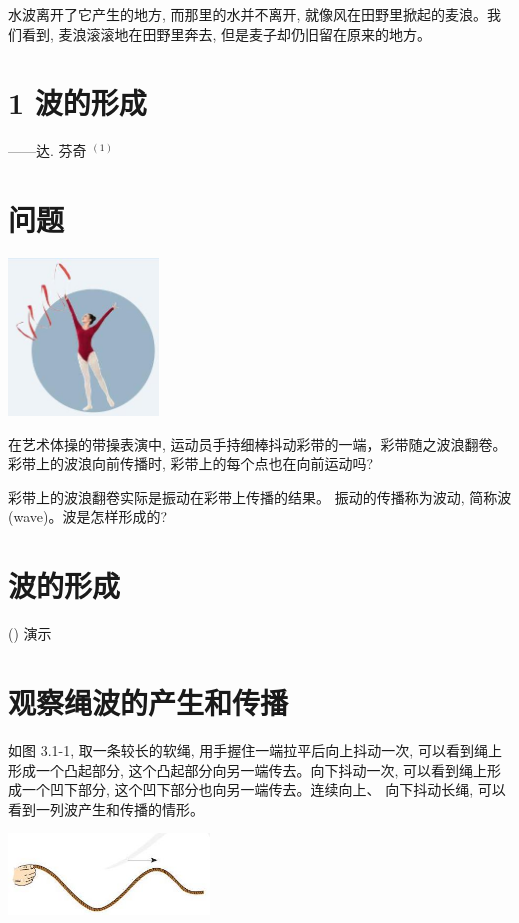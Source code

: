 \documentclass[10pt]{article}
\begin{document}
水波离开了它产生的地方, 而那里的水并不离开, 就像风在田野里掀起的麦浪。我们看到, 麦浪滚滚地在田野里奔去, 但是麦子却仍旧留在原来的地方。

\section*{1 波的形成}

——达. 芬奇 \({}^{\left( 1\right) }\)

\section*{问题}

\begin{center}
\includegraphics[max width=0.3\textwidth]{images/01910e4c-ebb8-7d2c-8f2f-2375bc1d2d12_67_503150.jpg}
\end{center}

在艺术体操的带操表演中, 运动员手持细棒抖动彩带的一端，彩带随之波浪翻卷。彩带上的波浪向前传播时, 彩带上的每个点也在向前运动吗?

彩带上的波浪翻卷实际是振动在彩带上传播的结果。 振动的传播称为波动, 简称波 (wave)。波是怎样形成的?

\section*{波的形成}

() 演示

\section*{观察绳波的产生和传播}

如图 3.1-1, 取一条较长的软绳, 用手握住一端拉平后向上抖动一次, 可以看到绳上形成一个凸起部分, 这个凸起部分向另一端传去。向下抖动一次, 可以看到绳上形成一个凹下部分, 这个凹下部分也向另一端传去。连续向上、 向下抖动长绳, 可以看到一列波产生和传播的情形。

\begin{center}
\includegraphics[max width=0.4\textwidth]{images/01910e4c-ebb8-7d2c-8f2f-2375bc1d2d12_67_629174.jpg}
\end{center}
\end{document}
